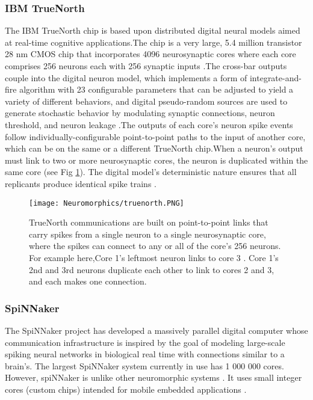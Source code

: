 \documentclass[12pt]{report}
\begin{document}
\subsubsection{IBM TrueNorth}
The IBM TrueNorth chip is based upon distributed digital neural models aimed at real-time cognitive applications.The chip is a very large, 5.4 million transistor 28 nm CMOS chip that incorporates 4096 neurosynaptic cores where each core comprises 256 neurons each with 256 synaptic inputs  .The cross-bar outputs couple into the digital neuron model, which implements a form of integrate-and-fire algorithm with 23 configurable parameters that can be adjusted to yield a variety of different behaviors, and digital pseudo-random sources are used to generate stochastic behavior by modulating synaptic connections, neuron threshold, and neuron leakage \cite{cassidy2013}.The outputs of each core's neuron spike events follow individually-configurable point-to-point paths to the input of another core, which can be on the same or a different TrueNorth chip.When a neuron's output must link to two or more neurosynaptic cores, the neuron is duplicated within the same core (see Fig \ref{fig:truenorth}). The digital model's deterministic nature ensures that all replicants produce identical spike trains \cite{furber2016}.

\begin{figure}[htp]
    \centering
    \texttt{[image: Neuromorphics/truenorth.PNG]}
    \caption{TrueNorth communications are built on point-to-point links that carry spikes from a single neuron to a single neurosynaptic core, where the spikes can connect to any or all of the core's 256 neurons. For example here,Core 1's leftmost neuron links to core 3 . Core 1's 2nd and 3rd neurons duplicate each other to link to cores 2 and 3, and each makes one connection.}
    \label{fig:truenorth}
\end{figure}

\subsubsection{SpiNNaker}
The SpiNNaker project \cite{furber2014} has developed a massively parallel digital computer whose communication infrastructure is inspired by the goal of modeling large-scale spiking neural networks in biological real time with connections similar to a brain's. The largest SpiNNaker system currently in use has 1 000 000 cores. However, spiNNaker is unlike other neuromorphic systems . It uses small integer cores (custom chips) intended for mobile embedded applications .
\end{document}
